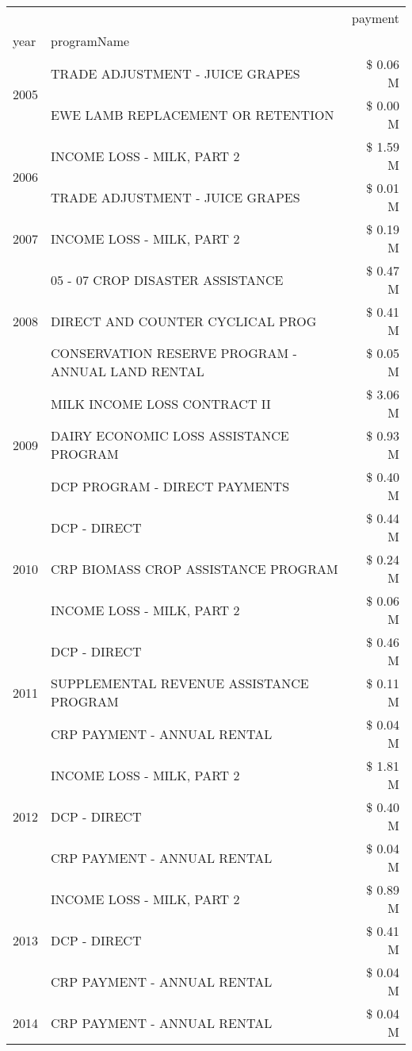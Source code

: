 \begin{tabular}{llr}
\toprule
 &  & payment \\
year & programName &  \\
\midrule
\multirow[t]{2}{*}{2005} & TRADE ADJUSTMENT - JUICE GRAPES & \$ 0.06 M \\
 & EWE LAMB REPLACEMENT OR RETENTION & \$ 0.00 M \\
\cline{1-3}
\multirow[t]{2}{*}{2006} & INCOME LOSS - MILK, PART 2 & \$ 1.59 M \\
 & TRADE ADJUSTMENT - JUICE GRAPES & \$ 0.01 M \\
\cline{1-3}
2007 & INCOME LOSS - MILK, PART 2 & \$ 0.19 M \\
\cline{1-3}
\multirow[t]{3}{*}{2008} & 05 - 07 CROP DISASTER ASSISTANCE & \$ 0.47 M \\
 & DIRECT AND COUNTER CYCLICAL PROG & \$ 0.41 M \\
 & CONSERVATION RESERVE PROGRAM - ANNUAL LAND RENTAL & \$ 0.05 M \\
\cline{1-3}
\multirow[t]{3}{*}{2009} & MILK INCOME LOSS CONTRACT II & \$ 3.06 M \\
 & DAIRY ECONOMIC LOSS ASSISTANCE PROGRAM & \$ 0.93 M \\
 & DCP PROGRAM - DIRECT PAYMENTS & \$ 0.40 M \\
\cline{1-3}
\multirow[t]{3}{*}{2010} & DCP - DIRECT & \$ 0.44 M \\
 & CRP BIOMASS CROP ASSISTANCE PROGRAM & \$ 0.24 M \\
 & INCOME LOSS - MILK, PART 2 & \$ 0.06 M \\
\cline{1-3}
\multirow[t]{3}{*}{2011} & DCP - DIRECT & \$ 0.46 M \\
 & SUPPLEMENTAL REVENUE ASSISTANCE PROGRAM & \$ 0.11 M \\
 & CRP PAYMENT - ANNUAL RENTAL & \$ 0.04 M \\
\cline{1-3}
\multirow[t]{3}{*}{2012} & INCOME LOSS - MILK, PART 2 & \$ 1.81 M \\
 & DCP - DIRECT & \$ 0.40 M \\
 & CRP PAYMENT - ANNUAL RENTAL & \$ 0.04 M \\
\cline{1-3}
\multirow[t]{3}{*}{2013} & INCOME LOSS - MILK, PART 2 & \$ 0.89 M \\
 & DCP - DIRECT & \$ 0.41 M \\
 & CRP PAYMENT - ANNUAL RENTAL & \$ 0.04 M \\
\cline{1-3}
\multirow[t]{2}{*}{2014} & CRP PAYMENT - ANNUAL RENTAL & \$ 0.04 M \\

\end{tabular}

